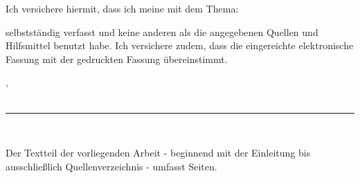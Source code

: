 \noindent Ich versichere hiermit, dass ich meine \thesistyp{} mit dem Thema:
\begin{center}
\textbf{ \thesistitel}
\end{center}

\noindent selbstständig verfasst und keine anderen als die angegebenen Quellen und Hilfsmittel benutzt habe. Ich versichere zudem, dass die 				  eingereichte elektronische Fassung mit der gedruckten Fassung übereinstimmt.

\vspace*{1cm}
\noindent \orterklaerung, \datumerklaerung{} \\
\vspace*{1.5cm} \\
\noindent\rule{8cm}{0.5pt}\\
\thesisauthor
\vfill


\noindent Der Textteil der vorliegenden Arbeit - beginnend mit der Einleitung bis ausschließlich Quellenverzeichnis - umfasst \pageref{seitenreinschrifft} Seiten.


